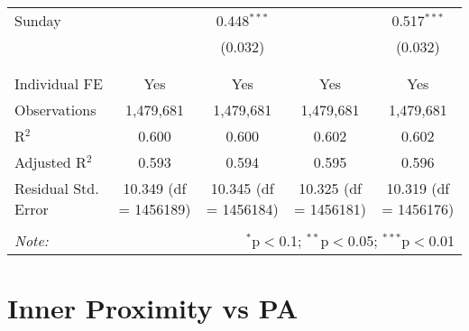 \documentclass[
]{article}
\begin{document}
\begin{table}[!htbp]
{\begin{tabular}{@{\extracolsep{5pt}}lcccc}
 Sunday &  & 0.448$^{***}$ &  & 0.517$^{***}$ \\ 
  &  & (0.032) &  & (0.032) \\ 
  & & & & \\ 
\hline \\[-1.8ex] 
Individual FE & Yes & Yes & Yes & Yes \\ 
Observations & 1,479,681 & 1,479,681 & 1,479,681 & 1,479,681 \\ 
R$^{2}$ & 0.600 & 0.600 & 0.602 & 0.602 \\ 
Adjusted R$^{2}$ & 0.593 & 0.594 & 0.595 & 0.596 \\ 
Residual Std. Error & 10.349 (df = 1456189) & 10.345 (df = 1456184) & 10.325 (df = 1456181) & 10.319 (df = 1456176) \\ 
\hline 
\hline \\[-1.8ex] 
\textit{Note:}  & \multicolumn{4}{r}{$^{*}$p$<$0.1; $^{**}$p$<$0.05; $^{***}$p$<$0.01} \\ 
\end{tabular}
} 
\end{table} 
\newpage
\section{Inner Proximity vs PA}
\end{document}
